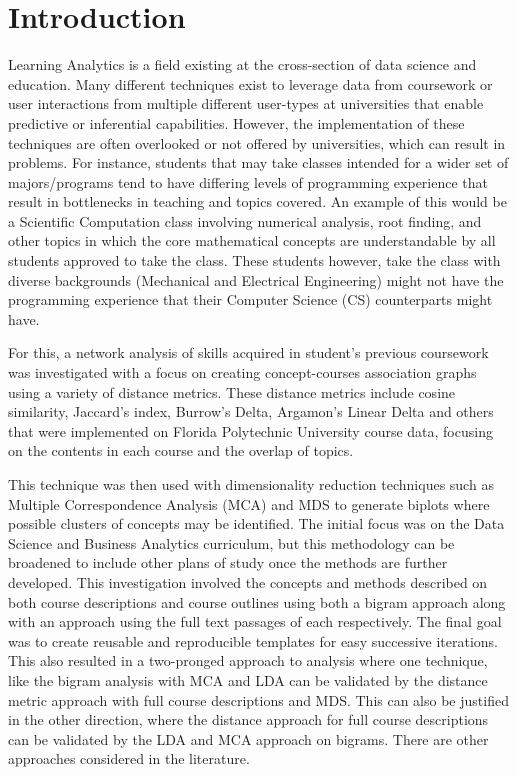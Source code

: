%
%
%

\chapter{Introduction}
\label{introduction}



\hspace*{0.5cm} Learning Analytics is a field existing at the cross-section of data science and education. 
Many different techniques exist to leverage data from coursework or user interactions from multiple different user-types at universities that enable predictive 
or inferential capabilities. However, the implementation of these techniques are often overlooked or not offered by universities, which can result in problems. 
For instance, students that may take classes intended for a wider set of majors/programs tend to have differing levels of programming experience that result in 
bottlenecks in teaching and topics covered. An example of this would be a Scientific Computation class involving numerical analysis, root finding, and other topics in which the
 core mathematical concepts are understandable by all students approved to take the class. These students however, take the class  with diverse backgrounds (Mechanical and 
 Electrical Engineering) might not have the programming experience that their Computer Science (CS) counterparts might have.  

For this, a network analysis of skills acquired in student’s previous coursework was investigated with a focus on creating concept-courses association graphs using 
a variety of distance metrics.  These distance metrics include cosine similarity,  Jaccard's index, Burrow's Delta, Argamon's Linear Delta and others \cite{lan_tag-aware_2014} 
\cite{lan_sparse_nodate}  that were implemented on Florida Polytechnic University course data, focusing on the contents in each course and the overlap of topics. 

\indent This technique was then used with dimensionality reduction techniques such as Multiple Correspondence Analysis (MCA) and MDS to generate biplots where 
possible clusters of concepts may be identified.  The initial focus was on the Data Science and Business Analytics curriculum, but this methodology can be broadened to include other 
plans of 
study once the methods are further developed. This investigation involved the concepts and methods described on both course descriptions and course outlines using both a 
bigram approach along with an approach using the full text passages of each respectively.  The final goal was to create reusable and reproducible templates for easy successive 
iterations. This also resulted in a two-pronged approach to analysis where one technique, like the bigram analysis with MCA and LDA can be validated by the distance metric approach
with full course descriptions and MDS. This can also be justified in the other direction, where the distance approach for full course descriptions can be validated by the LDA and 
MCA approach on bigrams. There are other approaches considered in the literature.
